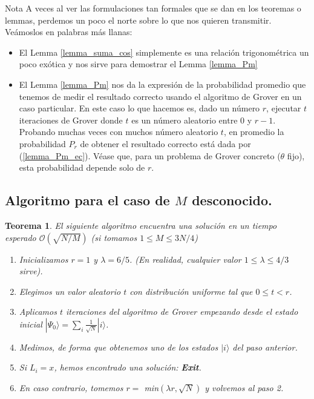 \documentclass[a4paper,11pt]{article} %
\newtheorem{theorem}{Teorema}
\numberwithin{equation}{section}
\begin{document}
	\begin{mybox}{Nota}
	A veces al ver las formulaciones tan formales que se dan en los teoremas o lemmas, perdemos un poco el 
	norte sobre lo que nos quieren transmitir. Veámoslos en palabras más llanas:
	\begin{itemize}
		\item El Lemma \ref{lemma_suma_cos} simplemente es una relación trigonométrica un poco exótica y nos
		 sirve para demostrar el Lemma \ref{lemma_Pm}

		\item El Lemma \ref{lemma_Pm} nos da la expresión de la probabilidad promedio que tenemos de medir el 
		resultado correcto usando el algoritmo de Grover en un caso particular. En este caso lo que hacemos es, 
		dado un número $r$, ejecutar $t$ iteraciones de Grover donde $t$ es un número aleatorio  entre $0$ y 
		$r-1$. Probando muchas veces con muchos número aleatorio $t$, en promedio la probabilidad 
		$P_r$ de obtener el resultado correcto está dada por (\ref{lemma_Pm_ec}). Véase que, para un problema de 
		Grover concreto ($\theta$ fijo), esta probabilidad depende solo de $r$. 
	\end{itemize}
	\end{mybox}

\subsection{Algoritmo para el caso de $M$ desconocido.}

\begin{theorem} \label{teorema_no-t}
El siguiente algoritmo encuentra una solución en un tiempo esperado $\mathcal{O} ( \sqrt{N/M} )$ (si tomamos $1 \leq M \leq 3N/4$)
\begin{enumerate}
\item Inicializamos $r=1$ y $\lambda = 6/5$. (En realidad, cualquier valor $1 \leq \lambda \leq 4/3$ sirve).

\item Elegimos un valor aleatorio $t$ con distribución uniforme tal que $0 \leq t < r$.

\item Aplicamos $t$ iteraciones del algoritmo de Grover empezando desde el estado inicial $| \Psi_0 \rangle = \sum_i \frac{1}{\sqrt{N}} |i \rangle$.

\item Medimos, de forma que obtenemos uno de los estados $|i \rangle$ del paso anterior. 

\item Si $L_i = x$, hemos encontrado una solución:  \textbf{Exit}.

\item En caso contrario, tomemos $r = $ min$(\lambda r, \sqrt{N})$ y volvemos al paso 2.
\end{enumerate}
\end{theorem}
\end{document}
